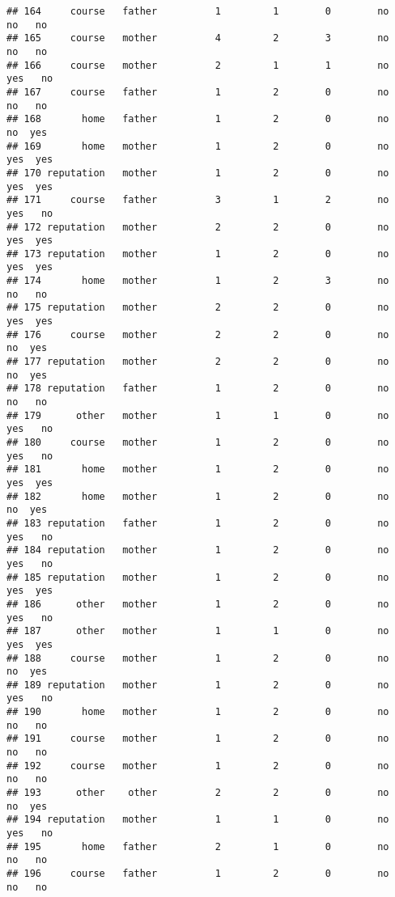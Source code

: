 \documentclass[
]{article}
\begin{document}
\begin{verbatim}
## 164     course   father          1         1        0        no     no   no
## 165     course   mother          4         2        3        no     no   no
## 166     course   mother          2         1        1        no    yes   no
## 167     course   father          1         2        0        no     no   no
## 168       home   father          1         2        0        no     no  yes
## 169       home   mother          1         2        0        no    yes  yes
## 170 reputation   mother          1         2        0        no    yes  yes
## 171     course   father          3         1        2        no    yes   no
## 172 reputation   mother          2         2        0        no    yes  yes
## 173 reputation   mother          1         2        0        no    yes  yes
## 174       home   mother          1         2        3        no     no   no
## 175 reputation   mother          2         2        0        no    yes  yes
## 176     course   mother          2         2        0        no     no  yes
## 177 reputation   mother          2         2        0        no     no  yes
## 178 reputation   father          1         2        0        no     no   no
## 179      other   mother          1         1        0        no    yes   no
## 180     course   mother          1         2        0        no    yes   no
## 181       home   mother          1         2        0        no    yes  yes
## 182       home   mother          1         2        0        no     no  yes
## 183 reputation   father          1         2        0        no    yes   no
## 184 reputation   mother          1         2        0        no    yes   no
## 185 reputation   mother          1         2        0        no    yes  yes
## 186      other   mother          1         2        0        no    yes   no
## 187      other   mother          1         1        0        no    yes  yes
## 188     course   mother          1         2        0        no     no  yes
## 189 reputation   mother          1         2        0        no    yes   no
## 190       home   mother          1         2        0        no     no   no
## 191     course   mother          1         2        0        no     no   no
## 192     course   mother          1         2        0        no     no   no
## 193      other    other          2         2        0        no     no  yes
## 194 reputation   mother          1         1        0        no    yes   no
## 195       home   father          2         1        0        no     no   no
## 196     course   father          1         2        0        no     no   no

\end{verbatim}
\end{document}
